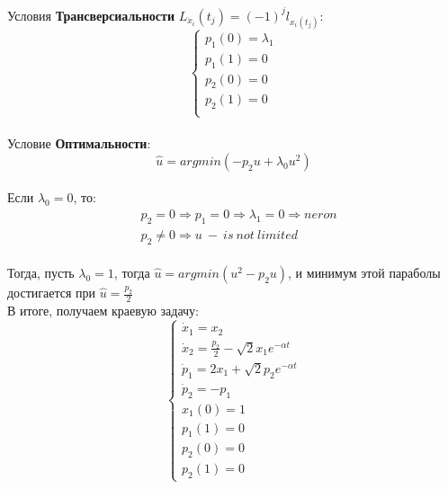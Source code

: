 \documentclass[12pt, a4paper]{article}
\begin{document}
 	Условия \textbf{Трансверсиальности} $L_{\dot{x}_i}(t_j) = (-1)^j l_{x_i(t_j)}$: \\
 	\begin{equation*}
		\begin{cases}
			p_1(0) = \lambda_1 \\
			p_1(1) = 0 \\
			p_2(0) = 0 \\
			p_2(1) = 0 \\
   		\end{cases}
 	\end{equation*} \\
 	Условие \textbf{Оптимальности}:
 	\begin{equation*}
		\hat{u} = argmin(-p_2 u + \lambda_0 u^2)
 	\end{equation*} \\
 	Если $\lambda_0 = 0$, то: 
 	\begin{align*}
 		&p_2 = 0 \Rightarrow p_1 = 0 \Rightarrow \lambda_1 = 0 \Rightarrow neron \\
 		&p_2 \neq 0 \Rightarrow u \ - \ is\ not \ limited
 	\end{align*} \\
 	Тогда, пусть $\lambda_0 = 1$, тогда $\hat{u} = argmin(u^2 - p_2 u)$, 
 	и минимум этой параболы достигается при $\hat{u} = \frac{p_2}{2}$ \\
 	В итоге, получаем краевую задачу: \\
 	\begin{equation*}
		\begin{cases}
			\dot{x}_1 = x_2 \\
			\dot{x}_2 = \frac{p_2}{2} - \sqrt{2} x_1 e^{-\alpha t} \\
			\dot{p}_1 = 2 x_1 + \sqrt{2} p_2 e^{-\alpha t} \\
			\dot{p}_2 = -p_1 \\
			x_1(0) = 1 \\
			p_1(1) = 0 \\
			p_2(0) = 0 \\
			p_2(1) = 0
   		\end{cases}
 	\end{equation*} \\
 	
\end{document}
